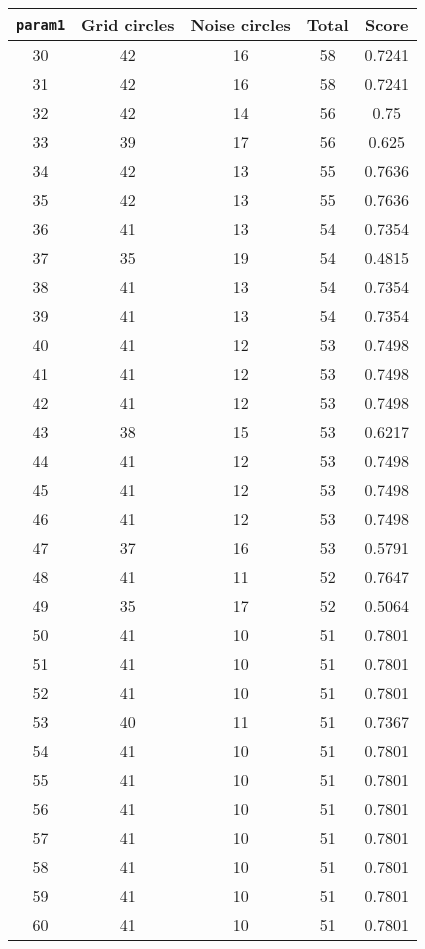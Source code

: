 \documentclass[letterpaper, 12pt]{article}
\begin{document}
\begin{longtable}{|c|c|c|c|c|}
\hline
\textbf{\texttt{param1}} & \textbf{Grid circles} & \textbf{Noise circles} & \textbf{Total} & \textbf{Score} \\
\hline
30 & 42 & 16 & 58 & 0.7241 \\
\hline
31 & 42 & 16 & 58 & 0.7241 \\
\hline
32 & 42 & 14 & 56 & 0.75 \\
\hline
33 & 39 & 17 & 56 & 0.625 \\
\hline
34 & 42 & 13 & 55 & 0.7636 \\
\hline
35 & 42 & 13 & 55 & 0.7636 \\
\hline
36 & 41 & 13 & 54 & 0.7354 \\
\hline
37 & 35 & 19 & 54 & 0.4815 \\
\hline
38 & 41 & 13 & 54 & 0.7354 \\
\hline
39 & 41 & 13 & 54 & 0.7354 \\
\hline
40 & 41 & 12 & 53 & 0.7498 \\
\hline
41 & 41 & 12 & 53 & 0.7498 \\
\hline
42 & 41 & 12 & 53 & 0.7498 \\
\hline
43 & 38 & 15 & 53 & 0.6217 \\
\hline
44 & 41 & 12 & 53 & 0.7498 \\
\hline
45 & 41 & 12 & 53 & 0.7498 \\
\hline
46 & 41 & 12 & 53 & 0.7498 \\
\hline
47 & 37 & 16 & 53 & 0.5791 \\
\hline
48 & 41 & 11 & 52 & 0.7647 \\
\hline
49 & 35 & 17 & 52 & 0.5064 \\
\hline
50 & 41 & 10 & 51 & 0.7801 \\
\hline
51 & 41 & 10 & 51 & 0.7801 \\
\hline
52 & 41 & 10 & 51 & 0.7801 \\
\hline
53 & 40 & 11 & 51 & 0.7367 \\
\hline
54 & 41 & 10 & 51 & 0.7801 \\
\hline
55 & 41 & 10 & 51 & 0.7801 \\
\hline
56 & 41 & 10 & 51 & 0.7801 \\
\hline
57 & 41 & 10 & 51 & 0.7801 \\
\hline
58 & 41 & 10 & 51 & 0.7801 \\
\hline
59 & 41 & 10 & 51 & 0.7801 \\
\hline
60 & 41 & 10 & 51 & 0.7801 \\

\end{longtable}
\end{document}
